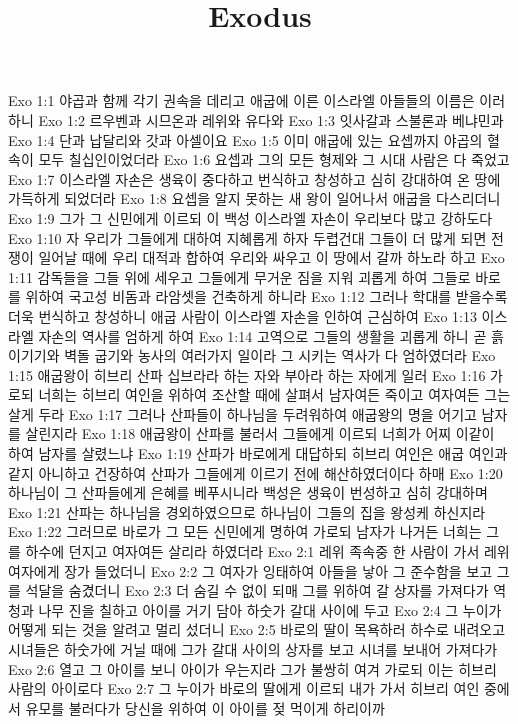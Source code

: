 

\title{Exodus}

Exo 1:1  야곱과 함께 각기 권속을 데리고 애굽에 이른 이스라엘 아들들의 이름은 이러하니
Exo 1:2  르우벤과 시므온과 레위와 유다와
Exo 1:3  잇사갈과 스불론과 베냐민과
Exo 1:4  단과 납달리와 갓과 아셀이요
Exo 1:5  이미 애굽에 있는 요셉까지 야곱의 혈속이 모두 칠십인이었더라
Exo 1:6  요셉과 그의 모든 형제와 그 시대 사람은 다 죽었고
Exo 1:7  이스라엘 자손은 생육이 중다하고 번식하고 창성하고 심히 강대하여 온 땅에 가득하게 되었더라
Exo 1:8  요셉을 알지 못하는 새 왕이 일어나서 애굽을 다스리더니
Exo 1:9  그가 그 신민에게 이르되 이 백성 이스라엘 자손이 우리보다 많고 강하도다
Exo 1:10  자 우리가 그들에게 대하여 지혜롭게 하자 두렵건대 그들이 더 많게 되면 전쟁이 일어날 때에 우리 대적과 합하여 우리와 싸우고 이 땅에서 갈까 하노라 하고
Exo 1:11  감독들을 그들 위에 세우고 그들에게 무거운 짐을 지워 괴롭게 하여 그들로 바로를 위하여 국고성 비돔과 라암셋을 건축하게 하니라
Exo 1:12  그러나 학대를 받을수록 더욱 번식하고 창성하니 애굽 사람이 이스라엘 자손을 인하여 근심하여
Exo 1:13  이스라엘 자손의 역사를 엄하게 하여
Exo 1:14  고역으로 그들의 생활을 괴롭게 하니 곧 흙 이기기와 벽돌 굽기와 농사의 여러가지 일이라 그 시키는 역사가 다 엄하였더라
Exo 1:15  애굽왕이 히브리 산파 십브라라 하는 자와 부아라 하는 자에게 일러
Exo 1:16  가로되 너희는 히브리 여인을 위하여 조산할 때에 살펴서 남자여든 죽이고 여자여든 그는 살게 두라
Exo 1:17  그러나 산파들이 하나님을 두려워하여 애굽왕의 명을 어기고 남자를 살린지라
Exo 1:18  애굽왕이 산파를 불러서 그들에게 이르되 너희가 어찌 이같이 하여 남자를 살렸느냐
Exo 1:19  산파가 바로에게 대답하되 히브리 여인은 애굽 여인과 같지 아니하고 건장하여 산파가 그들에게 이르기 전에 해산하였더이다 하매
Exo 1:20  하나님이 그 산파들에게 은혜를 베푸시니라 백성은 생육이 번성하고 심히 강대하며
Exo 1:21  산파는 하나님을 경외하였으므로 하나님이 그들의 집을 왕성케 하신지라
Exo 1:22  그러므로 바로가 그 모든 신민에게 명하여 가로되 남자가 나거든 너희는 그를 하수에 던지고 여자여든 살리라 하였더라
Exo 2:1  레위 족속중 한 사람이 가서 레위 여자에게 장가 들었더니
Exo 2:2  그 여자가 잉태하여 아들을 낳아 그 준수함을 보고 그를 석달을 숨겼더니
Exo 2:3  더 숨길 수 없이 되매 그를 위하여 갈 상자를 가져다가 역청과 나무 진을 칠하고 아이를 거기 담아 하숫가 갈대 사이에 두고
Exo 2:4  그 누이가 어떻게 되는 것을 알려고 멀리 섰더니
Exo 2:5  바로의 딸이 목욕하러 하수로 내려오고 시녀들은 하숫가에 거닐 때에 그가 갈대 사이의 상자를 보고 시녀를 보내어 가져다가
Exo 2:6  열고 그 아이를 보니 아이가 우는지라 그가 불쌍히 여겨 가로되 이는 히브리 사람의 아이로다
Exo 2:7  그 누이가 바로의 딸에게 이르되 내가 가서 히브리 여인 중에서 유모를 불러다가 당신을 위하여 이 아이를 젖 먹이게 하리이까
